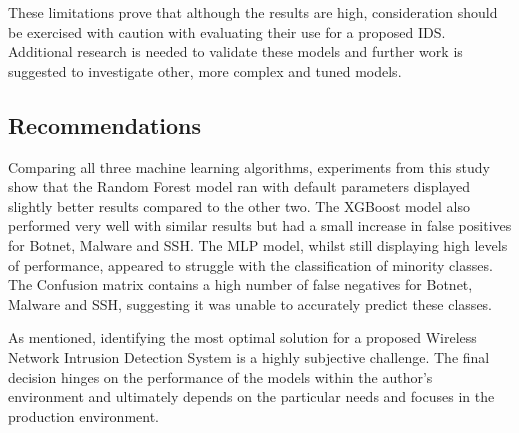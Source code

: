 These limitations prove that although the results are high, consideration should be exercised with caution with evaluating their use for a proposed IDS. Additional research is needed to validate these models and further work is suggested to investigate other, more complex and tuned models.

\subsection{Recommendations}

Comparing all three machine learning algorithms, experiments from this study show that the Random Forest model ran with default parameters displayed slightly better results compared to the other two. The XGBoost model also performed very well with similar results but had a small increase in false positives for Botnet, Malware and SSH. The MLP model, whilst still displaying high levels of performance, appeared to struggle with the classification of minority classes. The Confusion matrix contains a high number of false negatives for Botnet, Malware and SSH, suggesting it was unable to accurately predict these classes.

As mentioned, identifying the most optimal solution for a proposed Wireless Network Intrusion Detection System is a highly subjective challenge. The final decision hinges on the performance of the models within the author's environment and ultimately depends on the particular needs and focuses in the production environment. 
